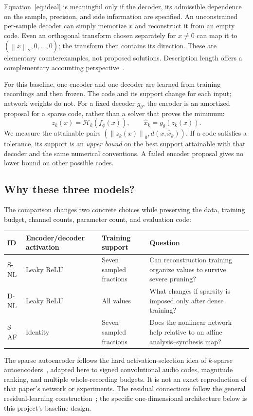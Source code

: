 \documentclass[11pt,a4paper]{article}
\newcommand{\norm}[1]{\left\lVert#1\right\rVert}
\newcommand{\topk}{\mathcal{H}_k}
\begin{document}
Equation~\eqref{eq:ideal} is meaningful only if the decoder, its admissible dependence on the sample, precision, and side information are specified. An unconstrained per-sample decoder can simply memorize $x$ and reconstruct it from an empty code. Even an orthogonal transform chosen separately for $x\ne0$ can map it to $(\norm{x}_2,0,\ldots,0)$; the transform then contains its direction. These are elementary counterexamples, not proposed solutions. Description length offers a complementary accounting perspective~\cite{rissanen1978}.

For this baseline, one encoder and one decoder are learned from training recordings and then frozen. The code and its support change for each input; network weights do not. For a fixed decoder $g_\theta$, the encoder is an amortized proposal for a sparse code, rather than a solver that proves the minimum:
\begin{equation}
 z_k(x)=\topk(f_\phi(x)),\qquad \widehat x_k=g_\theta(z_k(x)).
 \label{eq:baseline}
\end{equation}
We measure the attainable pairs $(\norm{z_k(x)}_0,d(x,\widehat x_k))$. If a code satisfies a tolerance, its support is an \emph{upper bound} on the best support attainable with that decoder and the same numerical conventions. A failed encoder proposal gives no lower bound on other possible codes.

\subsection{Why these three models?}
The comparison changes two concrete choices while preserving the data, training budget, channel counts, parameter count, and evaluation code:
\begin{center}
\begin{tabularx}{\linewidth}{lYYY}
\toprule
ID & Encoder/decoder activation & Training support & Question \\
\midrule
S-NL & Leaky ReLU & Seven sampled fractions & Can reconstruction training organize values to survive severe pruning? \\
D-NL & Leaky ReLU & All values & What changes if sparsity is imposed only after dense training? \\
S-AF & Identity & Seven sampled fractions & Does the nonlinear network help relative to an affine analysis--synthesis map? \\
\bottomrule
\end{tabularx}
\end{center}
The sparse autoencoder follows the hard activation-selection idea of $k$-sparse autoencoders~\cite{makhzani2014}, adapted here to signed convolutional audio codes, magnitude ranking, and multiple whole-recording budgets. It is not an exact reproduction of that paper's network or experiments. The residual connections follow the general residual-learning construction~\cite{he2016}; the specific one-dimensional architecture below is this project's baseline design.
\end{document}
